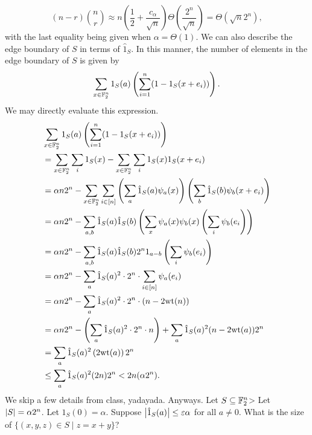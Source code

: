 \[ (n - r)\binom{n}{r} \approx n \left(\frac{1}{2} + \frac{c_\alpha}{\sqrt{n}}\right) \Theta\left(\frac{2^n}{\sqrt{n}}\right) = \Theta(\sqrt{n} 2^n), \]
with the last equality being given when $\alpha = \Theta(1)$.
\medskip\newline
We can also describe the edge boundary of $S$ in terms of $\hat{1}_S$. In this manner, the number of elements in the edge boundary of $S$ is given by
\[ \sum_{x \in \mathbb F_2^n} 1_S(a) \left(\sum_{i=1}^n (1 - 1_S(x + e_i))\right). \]
We may directly evaluate this expression.
\begin{align*}
    & \sum_{x \in \mathbb F_2^n} 1_S(a) \left(\sum_{i=1}^n (1 - 1_S(x + e_i))\right) \\
    &= \sum_{x \in \mathbb F_2^n} \sum_i 1_S(x) - \sum_{x \in \mathbb F_2^n} \sum_i 1_S(x) 1_S(x + e_i) \\
    &= \alpha n 2^n - \sum_{x \in \mathbb F_2^n} \sum_{i \in [n]} \left(\sum_a \hat{1}_S(a) \psi_a(x)\right) \left(\sum_b \hat{1}_S(b) \psi_b(x + e_i)\right) \\
    &= \alpha n 2^n - \sum_{a, b} \hat{1}_S(a) \hat{1}_S(b) \left(\sum_x \psi_a(x) \psi_b(x) \left(\sum_i \psi_b(e_i\right)\right) \\
    &= \alpha n 2^n - \sum_{a, b} \hat{1}_S(a) \hat{1}_S(b) 2^n 1_{a - b} \left(\sum_{i} \psi_b(e_i)\right) \\
    &= \alpha n 2^n - \sum_a \hat{1}_S(a)^2 \cdot 2^n \cdot \sum_{i \in [n]} \psi_a(e_i) \\
    &= \alpha n 2^n - \sum_a \hat{1}_S(a)^2 \cdot 2^n \cdot \left(n - 2 \mathrm{wt}(n)\right) \\
    &= \alpha n 2^n - \left(\sum_a \hat{1}_S(a)^2 \cdot 2^n \cdot n\right) + \sum_a \hat{1}_S(a)^2 (n - 2 \mathrm{wt}(a)) 2^n \\
    &= \sum_a \hat{1}_S(a)^2 \left(2 \mathrm{wt}(a)\right) 2^n \\
    &\leq \sum_a \hat{1}_S(a)^2 (2n) 2^n < 2n (\alpha 2^n).
\end{align*}
We skip a few details from class, yadayada. Anyways. Let $S \subseteq \mathbb F_2^n$> Let $\left\lvert S \right\rvert = \alpha 2^n$. Let $\hat{1}_S(0) = \alpha$. Suppose $\left\lvert \hat{1}_S(a) \right\rvert \leq \varepsilon \alpha$ for all $a \neq 0$. What is the size of $\{(x, y, z) \in S \mid z = x + y\}$?
